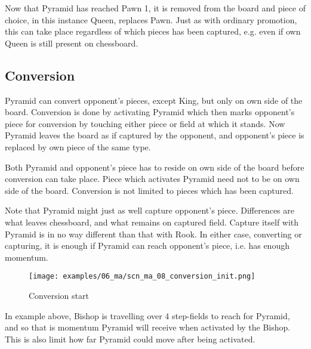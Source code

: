 Now that Pyramid has reached Pawn 1, it is removed from the board and piece of
choice, in this instance Queen, replaces Pawn. Just as with ordinary promotion,
this can take place regardless of which pieces has been captured, e.g. even if
own Queen is still present on chessboard.

\clearpage %

\subsection*{Conversion}

Pyramid can convert opponent's pieces, except King, but only on own side of
the board. Conversion is done by activating Pyramid which then marks opponent's
piece for conversion by touching either piece or field at which it stands. Now
Pyramid leaves the board as if captured by the opponent, and opponent's piece
is replaced by own piece of the same type.

Both Pyramid and opponent's piece has to reside on own side of the board before
conversion can take place. Piece which activates Pyramid need not to be on own
side of the board. Conversion is not limited to pieces which has been captured.

Note that Pyramid might just as well capture opponent's piece. Differences are
what leaves chessboard, and what remains on captured field. Capture itself with
Pyramid is in no way different than that with Rook. In either case, converting
or capturing, it is enough if Pyramid can reach opponent's piece, i.e. has
enough momentum.

\clearpage %

\noindent
\begin{figure}[!h]
\texttt{[image: examples/06\_ma/scn\_ma\_08\_conversion\_init.png]}
\caption{Conversion start}
\label{fig:scn_ma_08_conversion_init}
\end{figure}

In example above, Bishop is travelling over 4 step-fields to reach for Pyramid,
and so that is momentum Pyramid will receive when activated by the Bishop.
This is also limit how far Pyramid could move after being activated.

